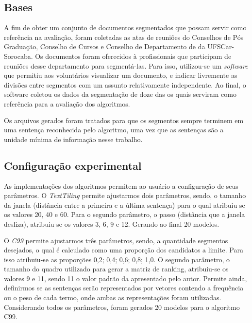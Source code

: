 \subsection{Bases}
	\label{subsec:bases}
A fim de obter um conjunto de documentos segmentados que possam servir como referência na avaliação, foram coletadas as atas de reuniões do Conselhos de Pós Graduação, Conselho de Cursos e Conselho de Departamento de da UFSCar-Sorocaba. Os documentos foram oferecidos à profissionais que participam de reuniões desse departamento para segmentá-las. Para isso, utilizou-se um \textit{software} que permitiu aos voluntários visualizar um documento, e indicar livremente as divisões entre segmentos com um assunto relativamente independente. Ao final, o software coletou os dados da segmentação de doze das os quais serviram como referência para a avaliação dos algoritmos.

Os arquivos gerados foram tratados para que os segmentos sempre terminem em uma sentença reconhecida pelo algoritmo, uma vez que as sentenças são a unidade mínima de informação nesse trabalho.
  

\subsection{Configuração experimental}
	\label{subsec:configuracaoexperimental}

As implementações dos algoritmos permitem ao usuário a configuração de seus parâmetros. 
%
O \textit{TextTiling} permite ajustarmos dois parâmetros, sendo, o tamanho da janela (distância entre a primeira e a última sentença) para o qual atribuiu-se os valores 20, 40 e 60. Para o segundo parâmetro, o passo (distância que a janela desliza), atribuiu-se os valores 3, 6, 9 e 12. Gerando ao final 20 modelos.
%

O \textit{C99} permite ajustarmos três parâmetros, sendo, a quantidade segmentos desejados, o qual é calculado como uma proporção dos candidatos a limite. Para isso atribuiu-se as proporções {0,2; 0,4; 0,6; 0,8; 1,0}. O segundo parâmetro, o tamanho do quadro utilizado para gerar a matriz de ranking, atribuiu-se os valores 9 e 11, sendo 11 o valor padrão da apresentado pelo autor. Permite ainda, definirmos se as sentenças serão representados por vetores contendo a frequência ou o peso de cada termo, onde ambas as representações foram utilizadas. Considerando todos os parâmetros, foram gerados 20 modelos para o algoritmo C99.

